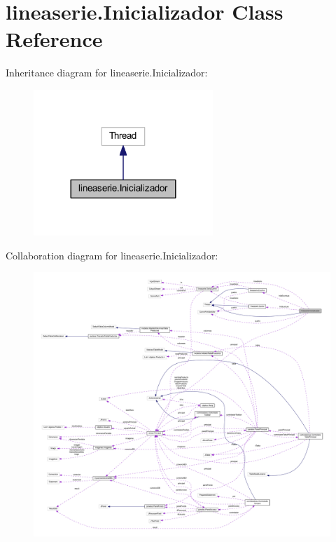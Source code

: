\hypertarget{classlineaserie_1_1_inicializador}{}\section{lineaserie.\+Inicializador Class Reference}
\label{classlineaserie_1_1_inicializador}


Inheritance diagram for lineaserie.\+Inicializador\+:\nopagebreak
\begin{figure}[H]
\begin{center}
\leavevmode
\includegraphics[width=192pt]{classlineaserie_1_1_inicializador__inherit__graph}
\end{center}
\end{figure}


Collaboration diagram for lineaserie.\+Inicializador\+:\nopagebreak
\begin{figure}[H]
\begin{center}
\leavevmode
\includegraphics[width=350pt]{classlineaserie_1_1_inicializador__coll__graph}
\end{center}
\end{figure}
